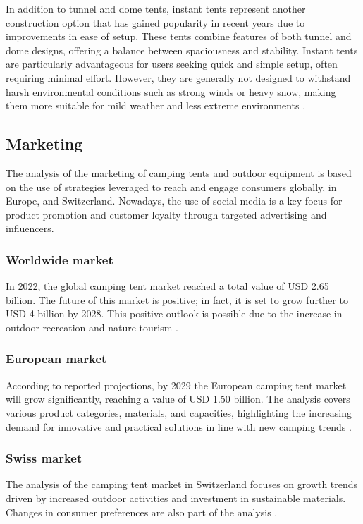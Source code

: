 \documentclass{article}
\begin{document}
In addition to tunnel and dome tents, instant tents represent another construction option
that has gained popularity in recent years due to improvements in ease of setup. These
tents combine features of both tunnel and dome designs, offering a balance between
spaciousness and stability. Instant tents are particularly advantageous for users seeking
quick and simple setup, often requiring minimal effort. However, they are generally not
designed to withstand harsh environmental conditions such as strong winds or heavy
snow, making them more suitable for mild weather and less extreme environments
\parencite{outdoorlife2024}.

\subsection{Marketing}
The analysis of the marketing of camping tents and outdoor equipment is based on the use
of strategies leveraged to reach and engage consumers globally, in Europe, and Switzerland.
Nowadays, the use of social media is a key focus for product promotion and customer
loyalty through targeted advertising and influencers.

\subsubsection{Worldwide market}
In 2022, the global camping tent market reached a total value of USD 2.65 billion.
The future of this market is positive; in fact, it is set to grow further to USD 4 billion
by 2028. This positive outlook is possible due to the increase in outdoor recreation and
nature tourism \parencite{expertmarket2023}.

\subsubsection{European market}
According to reported projections, by 2029 the European camping tent market will grow
significantly, reaching a value of USD 1.50 billion. The analysis covers various product
categories, materials, and capacities, highlighting the increasing demand for innovative
and practical solutions in line with new camping trends \parencite{arizton2024}.

\subsubsection{Swiss market}
The analysis of the camping tent market in Switzerland focuses on growth trends driven by
increased outdoor activities and investment in sustainable materials. Changes in consumer
preferences are also part of the analysis \parencite{6wresearch2023}.
\end{document}
